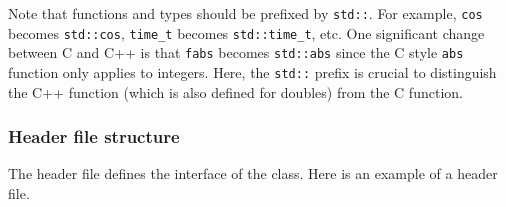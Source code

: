 \documentclass{article}[12pt,a4]
\begin{document}
Note that functions and types should be prefixed by {\tt std::}.
For example,
{\tt cos} becomes {\tt std::cos},
{\tt time\_t} becomes {\tt std::time\_t}, etc.
One significant change between C and C++ is that {\tt fabs} becomes {\tt std::abs} since
the C style {\tt abs} function only applies to integers.
Here, the {\tt std::} prefix is crucial to distinguish the C++ function (which is
also defined for doubles) from the C function.


\subsubsection{Header file structure}
\label{sec:header}

The header file defines the interface of the class.
Here is an example of a header file.
\end{document}
